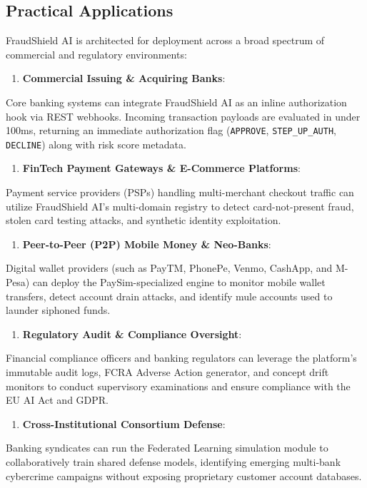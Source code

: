 \documentclass[12pt,a4paper,oneside]{report}
\begin{document}
\subsection{Practical Applications}

FraudShield AI is architected for deployment across a broad spectrum of commercial and regulatory environments:


\begin{enumerate}[leftmargin=0.35in]
\item \textbf{Commercial Issuing \& Acquiring Banks}:
\end{enumerate}
Core banking systems can integrate FraudShield AI as an inline authorization hook via REST webhooks. Incoming transaction payloads are evaluated in under 100ms, returning an immediate authorization flag (\texttt{APPROVE}, \texttt{STEP\_UP\_AUTH}, \texttt{DECLINE}) along with risk score metadata.


\begin{enumerate}[leftmargin=0.35in]
\item \textbf{FinTech Payment Gateways \& E-Commerce Platforms}:
\end{enumerate}
Payment service providers (PSPs) handling multi-merchant checkout traffic can utilize FraudShield AI's multi-domain registry to detect card-not-present fraud, stolen card testing attacks, and synthetic identity exploitation.


\begin{enumerate}[leftmargin=0.35in]
\item \textbf{Peer-to-Peer (P2P) Mobile Money \& Neo-Banks}:
\end{enumerate}
Digital wallet providers (such as PayTM, PhonePe, Venmo, CashApp, and M-Pesa) can deploy the PaySim-specialized engine to monitor mobile wallet transfers, detect account drain attacks, and identify mule accounts used to launder siphoned funds.


\begin{enumerate}[leftmargin=0.35in]
\item \textbf{Regulatory Audit \& Compliance Oversight}:
\end{enumerate}
Financial compliance officers and banking regulators can leverage the platform's immutable audit logs, FCRA Adverse Action generator, and concept drift monitors to conduct supervisory examinations and ensure compliance with the EU AI Act and GDPR.


\begin{enumerate}[leftmargin=0.35in]
\item \textbf{Cross-Institutional Consortium Defense}:
\end{enumerate}
Banking syndicates can run the Federated Learning simulation module to collaboratively train shared defense models, identifying emerging multi-bank cybercrime campaigns without exposing proprietary customer account databases.
\end{document}
